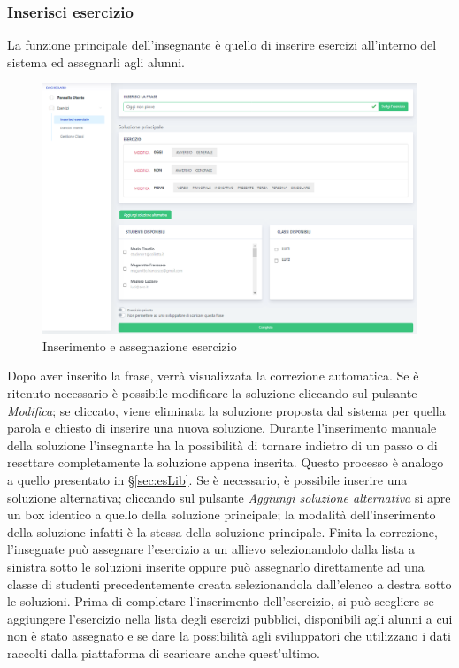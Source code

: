         \subsubsection{Inserisci esercizio}
          La funzione principale dell'insegnante è quello di inserire esercizi all'interno del sistema ed assegnarli agli alunni.
        	\begin{figure}[H]
            	\centering
        		\includegraphics[width=17cm]{sez/img/insegnante/inserisciEsercizio.PNG} 
            	\caption{Inserimento e assegnazione esercizio}\label{fig:1}
        	\end{figure}
        
         
          Dopo aver inserito la frase, verrà visualizzata la correzione automatica. Se è ritenuto necessario è possibile modificare la soluzione cliccando sul pulsante \textit{Modifica}; se cliccato, viene eliminata la soluzione proposta dal sistema per quella parola e chiesto di inserire una nuova soluzione. Durante l'inserimento manuale della soluzione l'insegnante ha la possibilità di tornare indietro di un passo o di resettare completamente la soluzione appena inserita. Questo processo è analogo a quello presentato in \S\ref{sec:esLib}. 
          Se è necessario, è possibile inserire una soluzione alternativa; cliccando sul pulsante \textit{Aggiungi soluzione alternativa} si apre un box identico a quello della soluzione principale; la modalità dell'inserimento della soluzione infatti è la stessa della soluzione principale.  \linebreak \linebreak Finita la correzione, l'insegnate può assegnare l'esercizio a un allievo selezionandolo dalla lista a sinistra sotto le soluzioni inserite oppure può assegnarlo direttamente ad una classe di studenti precedentemente creata selezionandola dall'elenco a destra sotto le soluzioni. \linebreak \linebreak
          Prima di completare l'inserimento dell'esercizio, si può scegliere se aggiungere l'esercizio nella lista degli esercizi pubblici, disponibili agli alunni a cui non è stato assegnato e se dare la possibilità agli sviluppatori che utilizzano i dati raccolti dalla piattaforma di scaricare anche quest'ultimo. 
          

